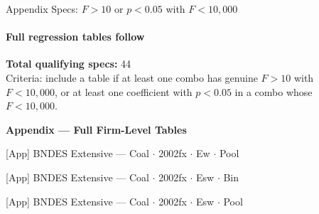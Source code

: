 \documentclass[aspectratio=169,10pt]{beamer}
\newcommand{\tabledir}{../tables/firm}
\begin{document}

\begin{frame}[t]{Appendix Specs: $F>10$ or $p<0.05$ with $F<10{,}000$}
\framesubtitle{Full regression tables follow}
\begin{center}
\footnotesize
\textbf{Total qualifying specs:} 44\\[0.5em]
{\scriptsize Criteria: include a table if at least one combo has genuine $F>10$ with $F<10{,}000$, or at least one coefficient with $p<0.05$ in a combo whose $F<10{,}000$.}
\end{center}
\end{frame}


\begin{frame}[plain]
\begin{center}
{\Large\textbf{Appendix --- Full Firm-Level Tables}}
\end{center}
\end{frame}

\begin{frame}[t,shrink=5]{[App] BNDES Extensive --- Coal $\cdot$ 2002fx $\cdot$ Ew $\cdot$ Pool}
\begin{center}\footnotesize

\end{center}
\end{frame}

\begin{frame}[t,shrink=5]{[App] BNDES Extensive --- Coal $\cdot$ 2002fx $\cdot$ Esw $\cdot$ Bin}
\begin{center}\footnotesize

\end{center}
\end{frame}

\begin{frame}[t,shrink=5]{[App] BNDES Extensive --- Coal $\cdot$ 2002fx $\cdot$ Esw $\cdot$ Pool}
\begin{center}\footnotesize

\end{center}
\end{frame}
\end{document}
